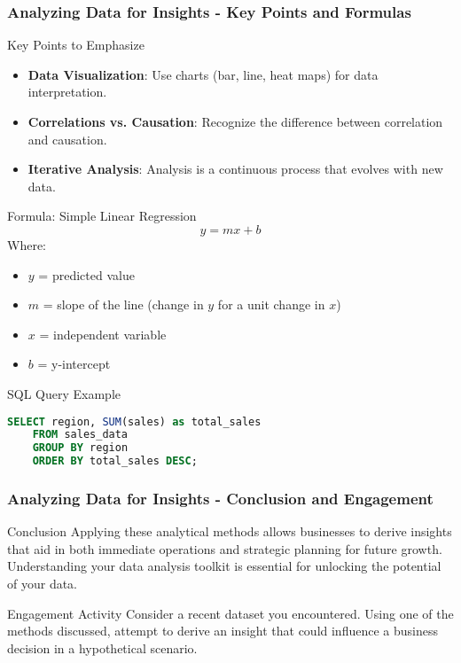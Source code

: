 \documentclass[aspectratio=169]{beamer}
\begin{document}
\begin{frame}[fragile]
    \frametitle{Analyzing Data for Insights - Key Points and Formulas}
    \begin{block}{Key Points to Emphasize}
        \begin{itemize}
            \item \textbf{Data Visualization}: Use charts (bar, line, heat maps) for data interpretation.
            \item \textbf{Correlations vs. Causation}: Recognize the difference between correlation and causation.
            \item \textbf{Iterative Analysis}: Analysis is a continuous process that evolves with new data.
        \end{itemize}
    \end{block}
    
    \begin{block}{Formula: Simple Linear Regression}
        \[
        y = mx + b
        \]
        Where:
        \begin{itemize}
            \item \( y \) = predicted value
            \item \( m \) = slope of the line (change in \( y \) for a unit change in \( x \))
            \item \( x \) = independent variable
            \item \( b \) = y-intercept
        \end{itemize}
    \end{block}

    \begin{block}{SQL Query Example}
    \begin{lstlisting}[language=SQL]
    SELECT region, SUM(sales) as total_sales
    FROM sales_data
    GROUP BY region
    ORDER BY total_sales DESC;
    \end{lstlisting}
    \end{block}
\end{frame}

\begin{frame}[fragile]
    \frametitle{Analyzing Data for Insights - Conclusion and Engagement}
    \begin{block}{Conclusion}
        Applying these analytical methods allows businesses to derive insights that aid in both immediate operations and strategic planning for future growth. 
        Understanding your data analysis toolkit is essential for unlocking the potential of your data.
    \end{block}

    \begin{block}{Engagement Activity}
        Consider a recent dataset you encountered. 
        Using one of the methods discussed, attempt to derive an insight that could influence a business decision in a hypothetical scenario.
    \end{block}
\end{frame}
\end{document}
